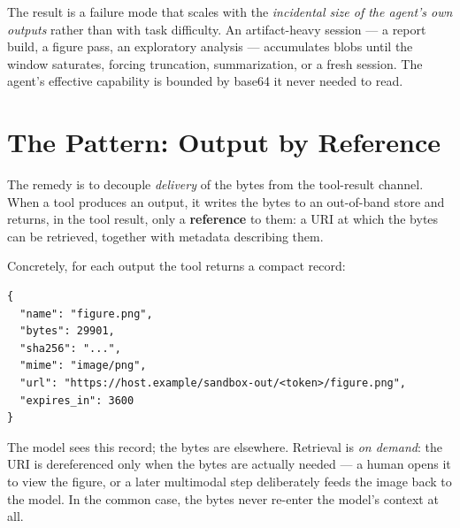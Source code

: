 \documentclass[11pt]{article}
\begin{document}
The result is a failure mode that scales with the \emph{incidental size of the agent's own outputs} rather than with task difficulty. An artifact-heavy session --- a report build, a figure pass, an exploratory analysis --- accumulates blobs until the window saturates, forcing truncation, summarization, or a fresh session. The agent's effective capability is bounded by base64 it never needed to read.

\section{The Pattern: Output by Reference}\label{sec:pattern}

The remedy is to decouple \emph{delivery} of the bytes from the tool-result channel. When a tool produces an output, it writes the bytes to an out-of-band store and returns, in the tool result, only a \textbf{reference} to them: a URI at which the bytes can be retrieved, together with metadata describing them.

Concretely, for each output the tool returns a compact record:

\begin{lstlisting}[style=code,caption={The metadata record returned in place of inline bytes.},label={lst:record}]
{
  "name": "figure.png",
  "bytes": 29901,
  "sha256": "...",
  "mime": "image/png",
  "url": "https://host.example/sandbox-out/<token>/figure.png",
  "expires_in": 3600
}
\end{lstlisting}

The model sees this record; the bytes are elsewhere. Retrieval is \emph{on demand}: the URI is dereferenced only when the bytes are actually needed --- a human opens it to view the figure, or a later multimodal step deliberately feeds the image back to the model. In the common case, the bytes never re-enter the model's context at all.
\end{document}
